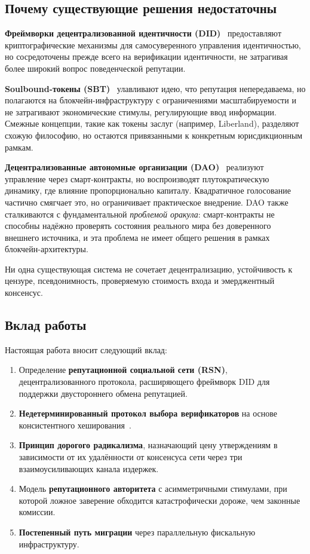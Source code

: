 \documentclass[11pt,a4paper,twocolumn]{article}
\begin{document}
\subsection{Почему существующие решения недостаточны}

\textbf{Фреймворки децентрализованной идентичности (DID)}~\cite{did2022} предоставляют криптографические механизмы для самосуверенного управления идентичностью, но сосредоточены прежде всего на верификации идентичности, не затрагивая более широкий вопрос поведенческой репутации.

\textbf{Soulbound-токены (SBT)}~\cite{weyl2022} улавливают идею, что репутация непередаваема, но полагаются на блокчейн-инфраструктуру с ограничениями масштабируемости и не затрагивают экономические стимулы, регулирующие ввод информации. Смежные концепции, такие как токены заслуг (например, Liberland), разделяют схожую философию, но остаются привязанными к конкретным юрисдикционным рамкам.

\textbf{Децентрализованные автономные организации (DAO)}~\cite{buterin2014} реализуют управление через смарт-контракты, но воспроизводят плутократическую динамику, где влияние пропорционально капиталу. Квадратичное голосование~\cite{buterin2019} частично смягчает это, но ограничивает практическое внедрение. DAO также сталкиваются с фундаментальной \emph{проблемой оракула}: смарт-контракты не способны надёжно проверять состояния реального мира без доверенного внешнего источника, и эта проблема не имеет общего решения в рамках блокчейн-архитектуры.

Ни одна существующая система не сочетает децентрализацию, устойчивость к цензуре, псевдонимность, проверяемую стоимость входа и эмерджентный консенсус.

\subsection{Вклад работы}

Настоящая работа вносит следующий вклад:
\begin{enumerate}[nosep]
\item Определение \textbf{репутационной социальной сети (RSN)}, децентрализованного протокола, расширяющего фреймворк DID для поддержки двустороннего обмена репутацией.
\item \textbf{Недетерминированный протокол выбора верификаторов} на основе консистентного хеширования~\cite{karger1997}.
\item \textbf{Принцип дорогого радикализма}, назначающий цену утверждениям в зависимости от их удалённости от консенсуса сети через три взаимоусиливающих канала издержек.
\item Модель \textbf{репутационного авторитета} с асимметричными стимулами, при которой ложное заверение обходится катастрофически дороже, чем законные комиссии.
\item \textbf{Постепенный путь миграции} через параллельную фискальную инфраструктуру.
\end{enumerate}
\end{document}
